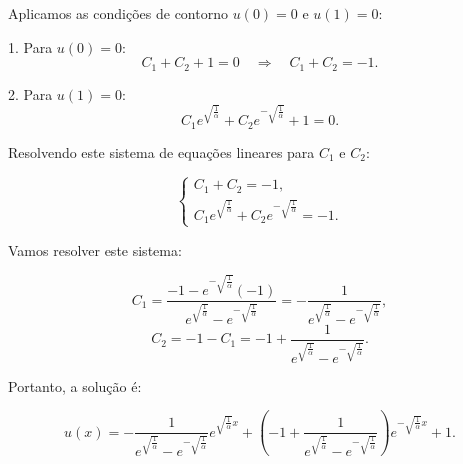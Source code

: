\documentclass{article}
\begin{document}
Aplicamos as condições de contorno \( u(0) = 0 \) e \( u(1) = 0 \):

1. Para \( u(0) = 0 \):
\[
C_1 + C_2 + 1 = 0 \quad \Rightarrow \quad C_1 + C_2 = -1.
\]

2. Para \( u(1) = 0 \):
\[
C_1 e^{\sqrt{\frac{1}{\alpha}}} + C_2 e^{-\sqrt{\frac{1}{\alpha}}} + 1 = 0.
\]

Resolvendo este sistema de equações lineares para \( C_1 \) e \( C_2 \):

\[
\begin{cases}
C_1 + C_2 = -1, \\
C_1 e^{\sqrt{\frac{1}{\alpha}}} + C_2 e^{-\sqrt{\frac{1}{\alpha}}} = -1.
\end{cases}
\]

Vamos resolver este sistema:

\[
C_1 = \frac{-1 - e^{-\sqrt{\frac{1}{\alpha}}} (-1)}{e^{\sqrt{\frac{1}{\alpha}}} - e^{-\sqrt{\frac{1}{\alpha}}}} = -\frac{1}{e^{\sqrt{\frac{1}{\alpha}}} - e^{-\sqrt{\frac{1}{\alpha}}}},
\]
\[
C_2 = -1 - C_1 = -1 + \frac{1}{e^{\sqrt{\frac{1}{\alpha}}} - e^{-\sqrt{\frac{1}{\alpha}}}}.
\]

Portanto, a solução é:

\[
u(x) = -\frac{1}{e^{\sqrt{\frac{1}{\alpha}}} - e^{-\sqrt{\frac{1}{\alpha}}}} e^{\sqrt{\frac{1}{\alpha}} x} + \left(-1 + \frac{1}{e^{\sqrt{\frac{1}{\alpha}}} - e^{-\sqrt{\frac{1}{\alpha}}}}\right) e^{-\sqrt{\frac{1}{\alpha}} x} + 1.
\]
\end{document}

